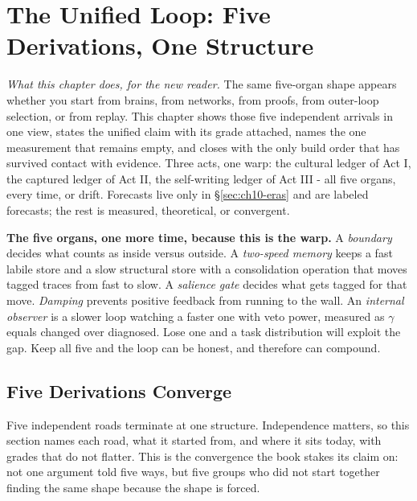 \chapter{The Unified Loop: Five Derivations, One Structure}
\label{ch:unified}

\begin{center}
\small\textit{What this chapter does, for the new reader.} The same five-organ shape appears whether you start from brains, from networks, from proofs, from outer-loop selection, or from replay. This chapter shows those five independent arrivals in one view, states the unified claim with its grade attached, names the one measurement that remains empty, and closes with the only build order that has survived contact with evidence. Three acts, one warp: the cultural ledger of Act I, the captured ledger of Act II, the self-writing ledger of Act III - all five organs, every time, or drift. Forecasts live only in \S\ref{sec:ch10-eras} and are labeled forecasts; the rest is measured, theoretical, or convergent.\end{center}

\noindent\textbf{The five organs, one more time, because this is the warp.} A \textit{boundary} decides what counts as inside versus outside. A \textit{two-speed memory} keeps a fast labile store and a slow structural store with a consolidation operation that moves tagged traces from fast to slow. A \textit{salience gate} decides what gets tagged for that move. \textit{Damping} prevents positive feedback from running to the wall. An \textit{internal observer} is a slower loop watching a faster one with veto power, measured as $\gamma$ equals changed over diagnosed. Lose one and a task distribution will exploit the gap. Keep all five and the loop can be honest, and therefore can compound.

\section{Five Derivations Converge}
\label{sec:ch10-converge}

Five independent roads terminate at one structure. Independence matters, so this section names each road, what it started from, and where it sits today, with grades that do not flatter. This is the convergence the book stakes its claim on: not one argument told five ways, but five groups who did not start together finding the same shape because the shape is forced.

